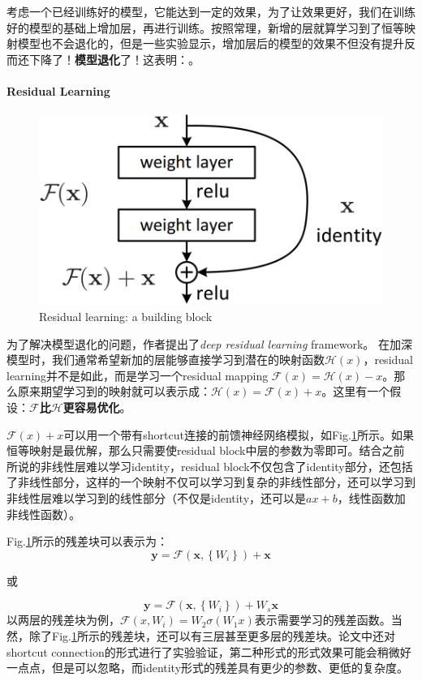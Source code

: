 考虑一个已经训练好的模型，它能达到一定的效果，为了让效果更好，我们在训练好的模型的基础上增加层，再进行训练。按照常理，新增的层就算学习到了恒等映射模型也不会退化的，但是一些实验显示，增加层后的模型的效果不但没有提升反而还下降了！\textbf{模型退化}了！这表明：。

\paragraph{Residual Learning}

\begin{figure}[h]
	\centering
	\includegraphics[width=.4\textwidth]{pics/residual.png}
	\caption{Residual learning: a building block}
	\label{fig:residual}
\end{figure}
为了解决模型退化的问题，作者提出了\textit{deep residual learning} framework。
在加深模型时，我们通常希望新加的层能够直接学习到潜在的映射函数$\mathcal{H}(x)$，residual learning并不是如此，而是学习一个residual mapping $\mathcal{F}(x) = \mathcal{H}(x) - x$。那么原来期望学习到的映射就可以表示成：$\mathcal{H}(x) = \mathcal{F}(x) + x$。这里有一个假设：\textbf{$\mathcal{F}$比$\mathcal{H}$更容易优化}。

$\mathcal{F}(x) + x$可以用一个带有shortcut连接的前馈神经网络模拟，如Fig.\ref{fig:residual}所示。如果恒等映射是最优解，那么只需要使residual block中层的参数为零即可。结合之前所说的非线性层难以学习identity，residual block不仅包含了identity部分，还包括了非线性部分，这样的一个映射不仅可以学习到复杂的非线性部分，还可以学习到非线性层难以学习到的线性部分（不仅是identity，还可以是$ax+b$，线性函数加非线性函数）。

Fig.\ref{fig:residual}所示的残差块可以表示为：
$$
\mathbf{y}=\mathcal{F}\left(\mathbf{x},\left\{W_{i}\right\}\right)+  \mathbf{x}
$$
\begin{center}
	或
\end{center}
$$
\mathbf{y}=\mathcal{F}\left(\mathbf{x},\left\{W_{i}\right\}\right)+W_{s} \mathbf{x}
$$
以两层的残差块为例，$\mathcal{F}(x, {W_i}) = W_2\sigma (W_1 x)$表示需要学习的残差函数。当然，除了Fig.\ref{fig:residual}所示的残差块，还可以有三层甚至更多层的残差块。论文中还对shortcut connection的形式进行了实验验证，第二种形式的形式效果可能会稍微好一点点，但是可以忽略，而identity形式的残差具有更少的参数、更低的复杂度。


